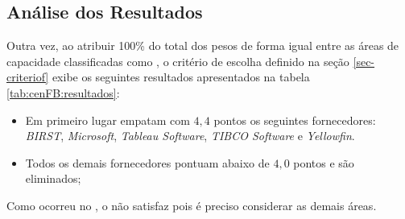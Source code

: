 \subsection*{Análise dos Resultados} 

    Outra vez, ao atribuir 100\% do total dos pesos de forma igual entre as áreas de capacidade classificadas como \MUST, o critério de escolha definido na seção \ref{sec-criteriof} exibe os seguintes resultados apresentados na tabela \ref{tab:cenFB:resultados}: 
    \begin{itemize}
        \item Em primeiro lugar empatam com $4,4$ pontos os seguintes fornecedores: \emph{BIRST}, \emph{Microsoft}, \emph{Tableau Software}, \emph{TIBCO Software} e \emph{Yellowfin}. 
        \item Todos os demais fornecedores pontuam abaixo de $4,0$ pontos e são eliminados;
    \end{itemize}
    
    Como ocorreu no \cenGB, o \cenFB \xspace não satisfaz pois é preciso considerar as demais áreas.